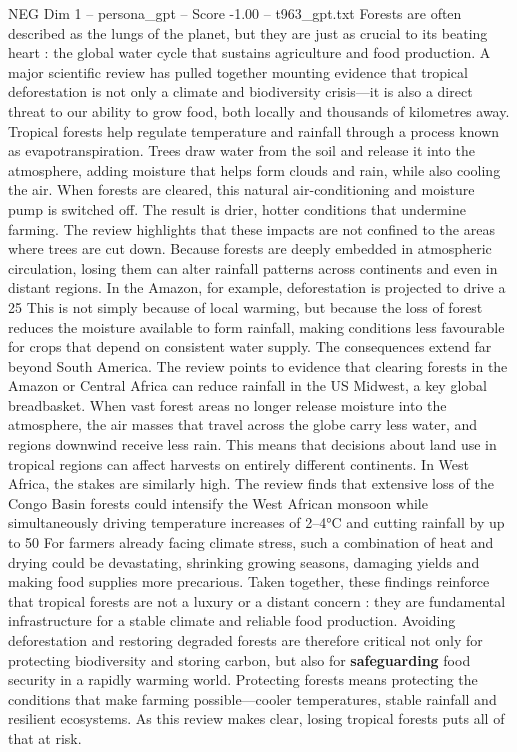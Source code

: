 \begin{textsample}{NEG Dim 1 – persona\_gpt – Score -1.00 – t963\_gpt.txt}  \label{ex:f1_neg_032}
Forests are often described as the lungs of the planet, but they are just as crucial to its beating heart : the global water cycle that sustains agriculture and food production.
A major scientific review has pulled together mounting evidence that tropical deforestation is not only a climate and biodiversity crisis—it is also a direct threat to our ability to grow food, both locally and thousands of kilometres away.
Tropical forests help regulate temperature and rainfall through a process known as evapotranspiration.
Trees draw water from the soil and release it into the atmosphere, adding moisture that helps form clouds and rain, while also cooling the air.
When forests are cleared, this natural air-conditioning and moisture pump is switched off.
The result is drier, hotter conditions that undermine farming.
The review highlights that these impacts are not confined to the areas where trees are cut down.
Because forests are deeply embedded in atmospheric circulation, losing them can alter rainfall patterns across continents and even in distant regions.
In the Amazon, for example, deforestation is projected to drive a 25 %
This is not simply because of local warming, but because the loss of forest reduces the moisture available to form rainfall, making conditions less favourable for crops that depend on consistent water supply.
The consequences extend far beyond South America.
The review points to evidence that clearing forests in the Amazon or Central Africa can reduce rainfall in the US Midwest, a key global breadbasket.
When vast forest areas no longer release moisture into the atmosphere, the air masses that travel across the globe carry less water, and regions downwind receive less rain.
This means that decisions about land use in tropical regions can affect harvests on entirely different continents.
In West Africa, the stakes are similarly high.
The review finds that extensive loss of the Congo Basin forests could intensify the West African monsoon while simultaneously driving temperature increases of 2–4°C and cutting rainfall by up to 50 %
For farmers already facing climate stress, such a combination of heat and drying could be devastating, shrinking growing seasons, damaging yields and making food supplies more precarious.
Taken together, these findings reinforce that tropical forests are not a luxury or a distant concern : they are fundamental infrastructure for a stable climate and reliable food production.
Avoiding deforestation and restoring degraded forests are therefore critical not only for protecting biodiversity and storing carbon, but also for \textbf{safeguarding} food security in a rapidly warming world.
Protecting forests means protecting the conditions that make farming possible—cooler temperatures, stable rainfall and resilient ecosystems.
As this review makes clear, losing tropical forests puts all of that at risk.

\end{textsample}
